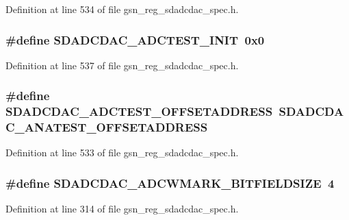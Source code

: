 Definition at line 534 of file gsn\_\-reg\_\-sdadcdac\_\-spec.h.

\hypertarget{a00569_af7424f193cef2c8a200c8ae824a61bf8}{
\subsubsection[{SDADCDAC\_\-ADCTEST\_\-INIT}]{\setlength{\rightskip}{0pt plus 5cm}\#define SDADCDAC\_\-ADCTEST\_\-INIT~0x0}}
\label{a00569_af7424f193cef2c8a200c8ae824a61bf8}


Definition at line 537 of file gsn\_\-reg\_\-sdadcdac\_\-spec.h.

\hypertarget{a00569_a1e310f8c14636f31dac98074e1228712}{
\subsubsection[{SDADCDAC\_\-ADCTEST\_\-OFFSETADDRESS}]{\setlength{\rightskip}{0pt plus 5cm}\#define SDADCDAC\_\-ADCTEST\_\-OFFSETADDRESS~SDADCDAC\_\-ANATEST\_\-OFFSETADDRESS}}
\label{a00569_a1e310f8c14636f31dac98074e1228712}


Definition at line 533 of file gsn\_\-reg\_\-sdadcdac\_\-spec.h.

\hypertarget{a00569_aa57aa84fcf2578e96b54b56c7cd289ab}{
\subsubsection[{SDADCDAC\_\-ADCWMARK\_\-BITFIELDSIZE}]{\setlength{\rightskip}{0pt plus 5cm}\#define SDADCDAC\_\-ADCWMARK\_\-BITFIELDSIZE~4}}
\label{a00569_aa57aa84fcf2578e96b54b56c7cd289ab}


Definition at line 314 of file gsn\_\-reg\_\-sdadcdac\_\-spec.h.

